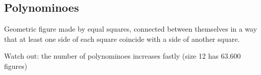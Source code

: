 \subsection{Polynominoes}

Geometric figure made by equal squares, connected between themselves in a way that at least one side of each square coincide with a side of another square.

Watch out: the number of polynominoes increases fastly (size 12 has 63.600 figures)
